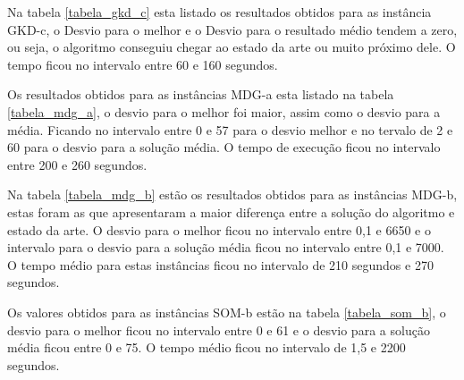 \documentclass[12pt]{article}
\begin{document}
Na tabela \ref{tabela_gkd_c} esta listado os resultados obtidos para as instância GKD-c, o Desvio para o melhor e o Desvio para o resultado médio tendem a zero, ou seja, o algoritmo conseguiu chegar ao estado da arte ou muito próximo dele. O tempo ficou no intervalo entre 60 e 160 segundos.

Os resultados obtidos para as instâncias MDG-a esta listado na tabela \ref{tabela_mdg_a}, o desvio para o melhor foi maior, assim como o desvio para a média. Ficando no intervalo entre 0 e 57 para o desvio melhor e no tervalo de 2 e 60 para o desvio para a solução média. O tempo de execução ficou no intervalo entre 200 e 260 segundos.

Na tabela \ref{tabela_mdg_b} estão os resultados obtidos para as instâncias MDG-b, estas foram as que apresentaram a maior diferença entre a solução do algoritmo e estado da arte. O desvio para o melhor ficou no intervalo entre 0,1 e 6650 e o intervalo para o desvio para a solução média ficou no intervalo entre 0,1 e 7000. O tempo médio para estas instâncias ficou no intervalo de 210 segundos e 270 segundos.

Os valores obtidos para as instâncias SOM-b estão na tabela \ref{tabela_som_b}, o desvio para o melhor ficou no intervalo entre 0 e 61 e o desvio para a solução média ficou entre 0 e 75. O tempo médio ficou no intervalo de 1,5 e 2200 segundos.








\end{document}
